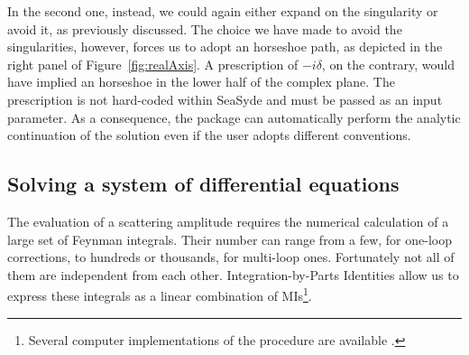 In the second one, instead, we could again either expand on the singularity or avoid it, as previously discussed. The choice we have made to avoid the singularities, however, forces us to adopt an horseshoe path, as depicted in the right panel of Figure~\ref{fig:realAxis}.
A prescription of $-i\delta$, on the contrary, would have implied an horseshoe in the lower half of the complex plane.
The prescription is not hard-coded within {\sc SeaSyde} and must be passed as an input parameter. As a consequence, the package can automatically perform the analytic continuation of the solution even if the user adopts different conventions.

\subsection{Solving a system of differential equations}
\label{sec:system}
The evaluation of a scattering amplitude requires the numerical calculation of a large set of Feynman integrals. Their number can range from a few, for one-loop corrections, to hundreds or thousands, for multi-loop ones. Fortunately not all of them are independent from each other.  Integration-by-Parts Identities \cite{Tkachov:1981wb,Chetyrkin:1981qh,Laporta:2001dd} allow us to express these integrals as a linear combination of MIs\footnote{Several computer implementations of the procedure are available \cite{Anastasiou:2004vj,Studerus:2009ye,vonManteuffel:2012np,Lee:2012cn,Lee:2013mka,Smirnov:2008iw,Smirnov:2014hma,Maierhoefer:2017hyi,Klappert:2020nbg}.}.

